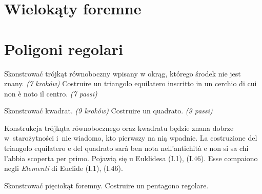 %

\section{Wielokąty foremne} %
\section{Poligoni regolari} %

\begin{problem}
    Skonstrować trójkąt równoboczny wpisany w okrąg, którego środek nie jest znany. \hfill \emph{(7 kroków)} %
    Costruire un triangolo equilatero inscritto in un cerchio di cui non è noto il centro. \hfill \emph{(7 passi)} %
\end{problem}

\begin{problem}
    Skonstrować kwadrat. \hfill \emph{(9 kroków)} %
    Costruire un quadrato. \hfill \emph{(9 passi)} %
\end{problem}

Konstrukcja trójkąta równobocznego oraz kwadratu będzie znana dobrze w~starożytności i~nie wiadomo, kto pierwszy na nią wpadnie. %
La costruzione del triangolo equilatero e del quadrato sarà ben nota nell'antichità e non si sa chi l'abbia scoperta per primo. %
Pojawią się u Euklidesa (I.1), (I.46). %
Esse compaiono negli \emph{Elementi} di Euclide (I.1), (I.46). %

\begin{problem}
    Skonstrować pięciokąt foremny. %
    Costruire un pentagono regolare. %
\end{problem}

